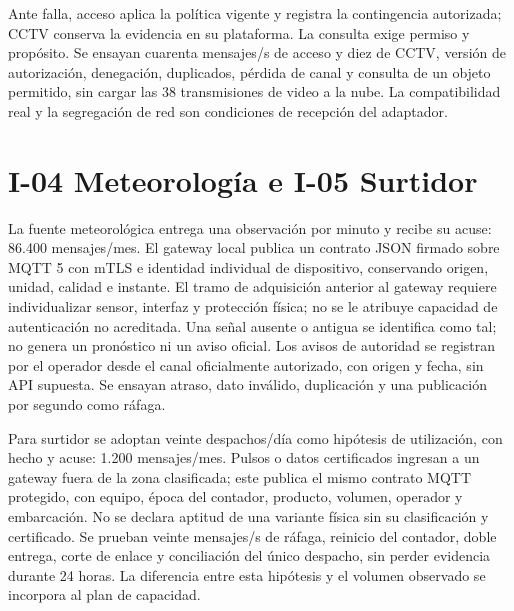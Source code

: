 Ante falla, acceso aplica la política vigente y registra la contingencia autorizada; CCTV conserva la evidencia en su plataforma. La consulta exige permiso y propósito. Se ensayan cuarenta mensajes/s de acceso y diez de CCTV, versión de autorización, denegación, duplicados, pérdida de canal y consulta de un objeto permitido, sin cargar las 38 transmisiones de video a la nube. La compatibilidad real y la segregación de red son condiciones de recepción del adaptador.

\section*{I-04 Meteorología e I-05 Surtidor}
La fuente meteorológica entrega una observación por minuto y recibe su acuse: 86.400 mensajes/mes. El gateway local publica un contrato JSON firmado sobre MQTT 5 con mTLS e identidad individual de dispositivo, conservando origen, unidad, calidad e instante. El tramo de adquisición anterior al gateway requiere individualizar sensor, interfaz y protección física; no se le atribuye capacidad de autenticación no acreditada. Una señal ausente o antigua se identifica como tal; no genera un pronóstico ni un aviso oficial. Los avisos de autoridad se registran por el operador desde el canal oficialmente autorizado, con origen y fecha, sin API supuesta. Se ensayan atraso, dato inválido, duplicación y una publicación por segundo como ráfaga.

Para surtidor se adoptan veinte despachos/día como hipótesis de utilización, con hecho y acuse: 1.200 mensajes/mes. Pulsos o datos certificados ingresan a un gateway fuera de la zona clasificada; este publica el mismo contrato MQTT protegido, con equipo, época del contador, producto, volumen, operador y embarcación. No se declara aptitud de una variante física sin su clasificación y certificado. Se prueban veinte mensajes/s de ráfaga, reinicio del contador, doble entrega, corte de enlace y conciliación del único despacho, sin perder evidencia durante 24 horas. La diferencia entre esta hipótesis y el volumen observado se incorpora al plan de capacidad.


